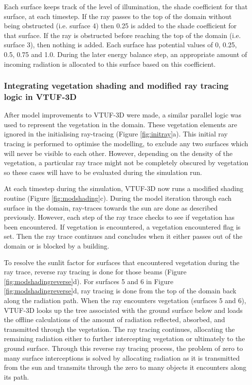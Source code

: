 \documentclass[final,3p,times,authoryear]{elsarticle}
\begin{document}
Each surface keeps track of the level of illumination, the shade coefficient for that surface, at each timestep. If the ray passes to the top of the domain without being obstructed (i.e. surface 4) then 0.25 is added to the shade coefficient for that surface. If the ray is obstructed before reaching the top of the domain (i.e. surface 3), then nothing is added. Each surface has potential values of 0, 0.25, 0.5, 0.75 and 1.0. During the later energy balance step, an appropriate amount of incoming radiation is allocated to this surface based on this coefficient.

\subsubsection{Integrating vegetation shading and modified ray tracing logic in VTUF-3D}\label{sec:Representationofvegetation}

After model improvements to VTUF-3D were made, a similar parallel logic was used to represent the vegetation in the domain. These vegetation elements are ignored in the initialising ray-tracing (Figure \ref{fig:initray}a). This initial ray tracing is performed to optimise the modelling, to exclude any two surfaces which will never be visible to each other. However, depending on the density of the vegetation, a particular ray trace might not be completely obscured by vegetation so these cases will have to be evaluated during the simulation run.

At each timestep during the simulation, VTUF-3D now runs a modified shading routine (Figure \ref{fig:modshading}c). During the model iteration through each surface in the domain, ray-traces towards the sun are done as described previously. However, each step of the ray trace checks to see if vegetation has been encountered. If vegetation is encountered, a vegetation encountered flag is set. Then the ray trace continues and concludes when it either passes out of the domain or is blocked by a building. 

To resolve the sunlit factor for surfaces that encountered vegetation during the ray trace, reverse ray tracing is done for those beams (Figure \ref{fig:modshadingreverse}d). For surfaces 5 and 6 in Figure \ref{fig:modshadingreverse}d, ray tracing is done from the top of the domain back along the radiation path. When the ray encounters vegetation (surfaces 5 and 6), VTUF-3D looks up the tree associated with the ground surface below and loads the offline calculations of the amount of radiation reflected, absorbed, and transmitted through the vegetation. The ray tracing continues, allocating the remaining radiation either to further intercepting vegetation or ultimately to the ground surface. Through this reverse ray tracing process, the problem of zero to many surface interceptions is solved by allocating radiation as it is transmitted from the sun and transmits through the zero to many objects it encounters along its path. 
\end{document}
